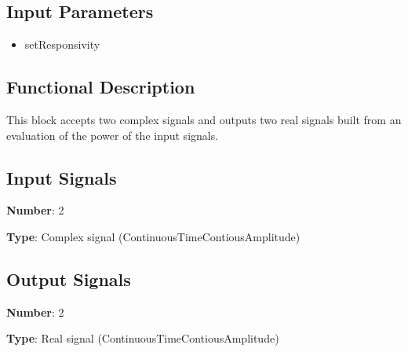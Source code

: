 \documentclass[../../sdf/tex/BPSK_system.tex]{subfiles}
\date{}
\begin{document}
\onlyinsubfile{\maketitle}

\subsection*{Input Parameters}

\begin{multicols}{2}
	\begin{itemize}
		\item setResponsivity
	\end{itemize}
\end{multicols}

\subsection*{Functional Description}

This block accepts two complex signals and outputs two real signals built from an evaluation of the power of the input signals.

\subsection*{Input Signals}

\textbf{Number}: 2

\textbf{Type}: Complex signal (ContinuousTimeContiousAmplitude)

\subsection*{Output Signals}

\textbf{Number}: 2

\textbf{Type}: Real signal (ContinuousTimeContiousAmplitude)
\end{document}

